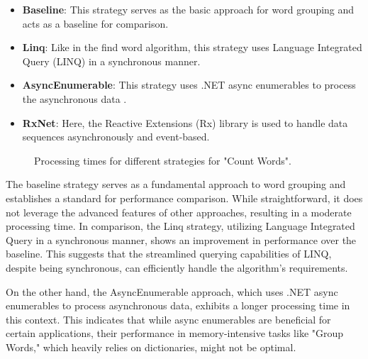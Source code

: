 \begin{itemize}
    \item \textbf{Baseline}: This strategy serves as the basic approach for word grouping and acts as a baseline for comparison.
    \item \textbf{Linq}: Like in the find word algorithm, this strategy uses Language Integrated Query (LINQ) in a synchronous manner.
    \item \textbf{AsyncEnumerable}: This strategy uses .NET async enumerables to process the asynchronous data .
    \item \textbf{RxNet}: Here, the Reactive Extensions (Rx) library is used to handle data sequences asynchronously and event-based.
\end{itemize}


\begin{figure}[H]
    \raggedright
    \caption{Processing times for different strategies for "Count Words".}
    \label{fig:group_word_processing_times_cs}
\end{figure}

The baseline strategy serves as a fundamental approach to word grouping and establishes a standard for performance comparison. While straightforward, it does not leverage the advanced features of other approaches, resulting in a moderate processing time. In comparison, the Linq strategy, utilizing Language Integrated Query in a synchronous manner, shows an improvement in performance over the baseline. This suggests that the streamlined querying capabilities of LINQ, despite being synchronous, can efficiently handle the algorithm's requirements.

On the other hand, the AsyncEnumerable approach, which uses .NET async enumerables to process asynchronous data, exhibits a longer processing time in this context. This indicates that while async enumerables are beneficial for certain applications, their performance in memory-intensive tasks like "Group Words," which heavily relies on dictionaries, might not be optimal.

